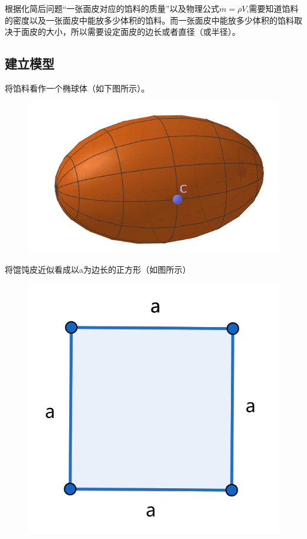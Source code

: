 \documentclass[lang=cn,a4paper]{elegantpaper}
\begin{document}
    根据化简后问题“一张面皮对应的馅料的质量”以及物理公式$m=\rho V$,需要知道馅料的密度以及一张面皮中能放多少体积的馅料。而一张面皮中能放多少体积的馅料取决于面皮的大小，所以需要设定面皮的边长或者直径（或半径）。
    \subsection{建立模型}
    将馅料看作一个椭球体（如下图所示）。
    \begin{figure}[H]
        \centering
        \includegraphics[scale=0.2]{ellipsoids.png}
    \end{figure}
    将馄饨皮近似看成以a为边长的正方形（如图所示）
    \begin{figure}[H]
        \centering
        \includegraphics[scale=0.5]{square.png}
    \end{figure}
\end{document}
